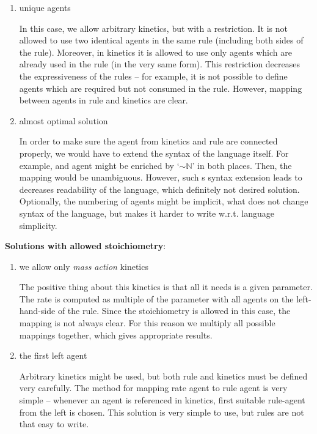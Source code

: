 \documentclass[12pt]{fithesis2}
\begin{document}
\begin{enumerate}
\item unique agents

In this case, we allow arbitrary kinetics, but with a restriction. It is not allowed to use two identical agents in the same rule (including both sides of the rule). Moreover, in kinetics it is allowed to use only agents which are already used in the rule (in the very same form). This restriction decreases the expressiveness of the rules -- for example, it is not possible to define agents which are required but not consumed in the rule. However, mapping between agents in rule and kinetics are clear.

\item almost optimal solution

In order to make sure the agent from kinetics and rule are connected properly, we would have to extend the syntax of the language itself. For example, and agent might be enriched by `$\sim\mathbb{N}$' in both places. Then, the mapping would be unambiguous. However, such s syntax extension leads to decreases readability of the language, which definitely not desired solution. Optionally, the numbering of agents might be implicit, what does not change syntax of the language, but makes it harder to write w.r.t. language simplicity.

\end{enumerate}


\textbf{Solutions with allowed stoichiometry}:

\begin{enumerate}
\item we allow only \emph{mass action} kinetics

The positive thing about this kinetics is that all it needs is a given parameter. The rate is computed as multiple of the parameter with all agents on the left-hand-side of the rule. Since the stoichiometry is allowed in this case, the mapping is not always clear. For this reason we multiply all possible mappings together, which gives appropriate results.

\item the first left agent

Arbitrary kinetics might be used, but both rule and kinetics must be defined very carefully. The method for mapping rate agent to rule agent is very simple -- whenever an agent is referenced in kinetics, first suitable rule-agent from the left is chosen. This solution is very simple to use, but rules are not that easy to write.

\end{enumerate}
\end{document}
